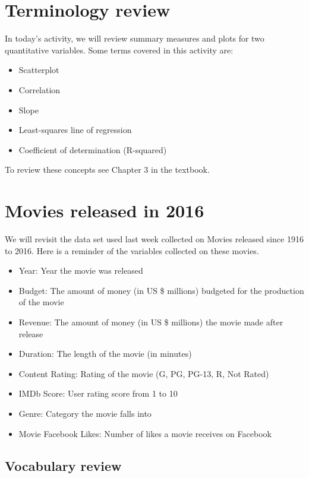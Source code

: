 \documentclass[
]{report}
\begin{document}
\hypertarget{terminology-review}{%
\section{Terminology review}\label{terminology-review}}

In today's activity, we will review summary measures and plots for two quantitative variables. Some terms covered in this activity are:

\begin{itemize}
\item
  Scatterplot
\item
  Correlation
\item
  Slope
\item
  Least-squares line of regression
\item
  Coefficient of determination (R-squared)
\end{itemize}

To review these concepts see Chapter 3 in the textbook.

\hypertarget{movies-released-in-2016}{%
\section{Movies released in 2016}\label{movies-released-in-2016}}

We will revisit the data set used last week collected on Movies released since 1916 to 2016. Here is a reminder of the variables collected on these movies.

\begin{itemize}
\item
  Year: Year the movie was released
\item
  Budget: The amount of money (in US \$ millions) budgeted for the production of the movie
\item
  Revenue: The amount of money (in US \$ millions) the movie made after release
\item
  Duration: The length of the movie (in minutes)
\item
  Content Rating: Rating of the movie (G, PG, PG-13, R, Not Rated)
\item
  IMDb Score: User rating score from 1 to 10
\item
  Genre: Category the movie falls into
\item
  Movie Facebook Likes: Number of likes a movie receives on Facebook
\end{itemize}

\hypertarget{vocabulary-review}{%
\subsection{Vocabulary review}\label{vocabulary-review}}
\end{document}

